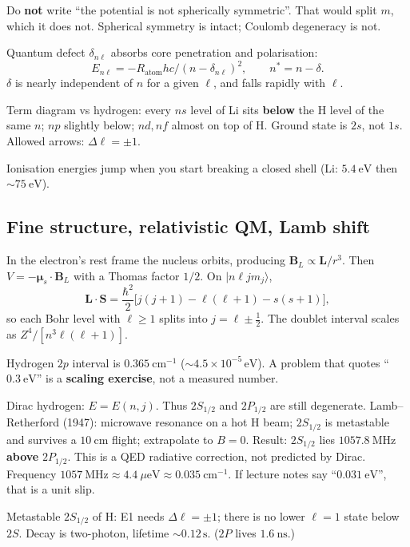 \documentclass[11pt,a4paper]{article}
\begin{document}
\begin{trapbox}
Do \textbf{not} write ``the potential is not spherically symmetric''. That would split \(m\), which it does not. Spherical symmetry is intact; Coulomb degeneracy is not.
\end{trapbox}

Quantum defect \(\delta_{n\ell}\) absorbs core penetration and polarisation:
\[
E_{n\ell}=-R_{\mathrm{atom}}hc\big/(n-\delta_{n\ell})^2,\qquad n^*=n-\delta.
\]
\(\delta\) is nearly independent of \(n\) for a given \(\ell\), and falls rapidly with \(\ell\).

Term diagram vs hydrogen: every \(ns\) level of Li sits \textbf{below} the H level of the same \(n\); \(np\) slightly below; \(nd,nf\) almost on top of H. Ground state is \(2s\), not \(1s\). Allowed arrows: \(\Delta\ell=\pm 1\).

Ionisation energies jump when you start breaking a closed shell (Li: \(5.4~\mathrm{eV}\) then \(\sim 75~\mathrm{eV}\)).

\subsection{Fine structure, relativistic QM, Lamb shift}
In the electron's rest frame the nucleus orbits, producing \(\mathbf{B}_L\propto\mathbf{L}/r^3\). Then \(V=-\boldsymbol{\mu}_s\cdot\mathbf{B}_L\) with a Thomas factor \(1/2\). On \(\lvert n\ell jm_j\rangle\),
\[
\mathbf{L}\cdot\mathbf{S}=\frac{\hbar^2}{2}\bigl[j(j+1)-\ell(\ell+1)-s(s+1)\bigr],
\]
so each Bohr level with \(\ell\ge 1\) splits into \(j=\ell\pm\tfrac12\). The doublet interval scales as \(Z^4/[n^3\ell(\ell+1)]\).

Hydrogen \(2p\) interval is \(0.365~\mathrm{cm}^{-1}\) (\(\sim 4.5\times 10^{-5}\,\mathrm{eV}\)). A problem that quotes ``\(0.3~\mathrm{eV}\)'' is a \textbf{scaling exercise}, not a measured number.

Dirac hydrogen: \(E=E(n,j)\). Thus \(2S_{1/2}\) and \(2P_{1/2}\) are still degenerate. Lamb--Retherford (1947): microwave resonance on a hot H beam; \(2S_{1/2}\) is metastable and survives a \(10~\mathrm{cm}\) flight; extrapolate to \(B=0\). Result: \(2S_{1/2}\) lies \textbf{\(1057.8~\mathrm{MHz}\) above} \(2P_{1/2}\). This is a QED radiative correction, not predicted by Dirac. Frequency \(1057~\mathrm{MHz}\approx 4.4~\mu\mathrm{eV}\approx 0.035~\mathrm{cm}^{-1}\). If lecture notes say ``\(0.031~\mathrm{eV}\)'', that is a unit slip.

Metastable \(2S_{1/2}\) of H: E1 needs \(\Delta\ell=\pm 1\); there is no lower \(\ell=1\) state below \(2S\). Decay is two-photon, lifetime \(\sim 0.12\,\mathrm{s}\). (\(2P\) lives \(1.6~\mathrm{ns}\).)
\end{document}
